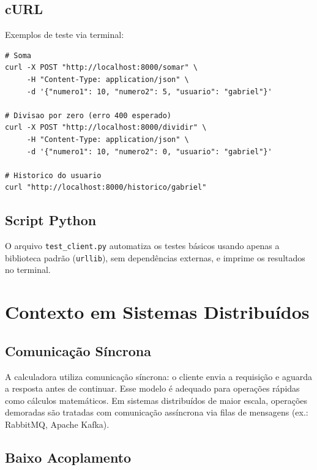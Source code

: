 \documentclass[12pt, a4paper]{article}
\begin{document}
\subsection{cURL}

Exemplos de teste via terminal:

\begin{lstlisting}[style=bash, caption={Exemplos de testes com cURL}]
# Soma
curl -X POST "http://localhost:8000/somar" \
     -H "Content-Type: application/json" \
     -d '{"numero1": 10, "numero2": 5, "usuario": "gabriel"}'

# Divisao por zero (erro 400 esperado)
curl -X POST "http://localhost:8000/dividir" \
     -H "Content-Type: application/json" \
     -d '{"numero1": 10, "numero2": 0, "usuario": "gabriel"}'

# Historico do usuario
curl "http://localhost:8000/historico/gabriel"
\end{lstlisting}

\subsection{Script Python}

O arquivo \texttt{test\_client.py} automatiza os testes básicos usando apenas a biblioteca padrão (\texttt{urllib}), sem dependências externas, e imprime os resultados no terminal.

\section{Contexto em Sistemas Distribuídos}

\subsection{Comunicação Síncrona}

A calculadora utiliza comunicação síncrona: o cliente envia a requisição e aguarda a resposta antes de continuar. Esse modelo é adequado para operações rápidas como cálculos matemáticos. Em sistemas distribuídos de maior escala, operações demoradas são tratadas com comunicação assíncrona via filas de mensagens (ex.: RabbitMQ, Apache Kafka).

\subsection{Baixo Acoplamento}
\end{document}
